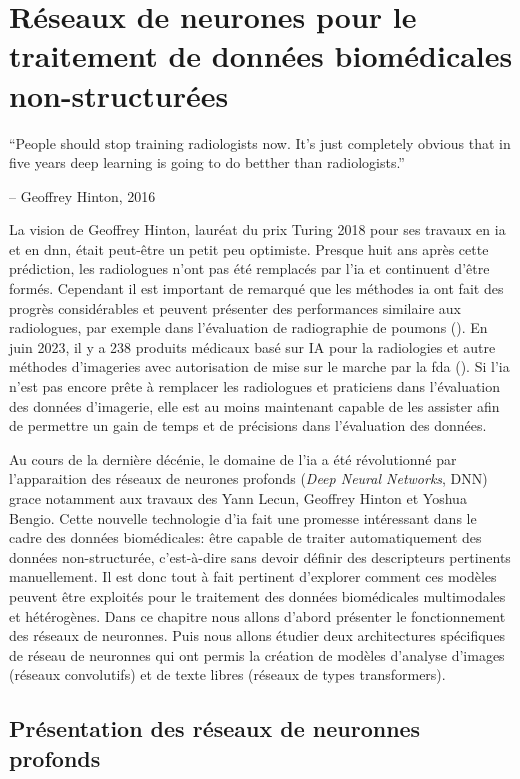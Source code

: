 \chapter{Réseaux de neurones pour le traitement de données biomédicales non-structurées}

\epigraph{\LARGE{``People should stop training radiologists now. It's just completely obvious that in five years deep learning is going to do betther than radiologists.''}}{\LARGE{-- Geoffrey Hinton, 2016}}


La vision de Geoffrey Hinton, lauréat du prix Turing 2018 pour ses travaux en \gls{ia} et en \gls{dnn}, était peut-être un petit peu optimiste. Presque huit ans après cette prédiction, les radiologues n'ont pas été remplacés par l'\gls{ia} et continuent d'être formés. Cependant il est important de remarqué que les méthodes \gls{ia} ont fait des progrès considérables et peuvent présenter des performances similaire aux radiologues, par exemple dans l'évaluation de radiographie de poumons (\cite{frauke_rudolf_ai_2023}). En juin 2023, il y a 238 produits médicaux basé sur IA pour la radiologies et autre méthodes d'imageries avec autorisation de mise sur le marche par la \gls{fda} (\cite{keith_j_dreyer_acr_2023}). Si l'\gls{ia} n'est pas encore prête à remplacer les radiologues et praticiens dans l'évaluation des données d'imagerie, elle est au moins maintenant capable de les assister afin de permettre un gain de temps et de précisions dans l'évaluation des données.


Au cours de la dernière décénie, le domaine de l'\gls{ia} a été révolutionné par l'apparaition des réseaux de neurones profonds (\textit{Deep Neural Networks}, DNN) grace notamment aux travaux des Yann Lecun, Geoffrey Hinton et Yoshua Bengio. Cette nouvelle technologie d'\gls{ia} fait une promesse intéressant dans le cadre des données biomédicales: être capable de traiter automatiquement des données non-structurée, c’est-à-dire sans devoir définir des descripteurs pertinents manuellement. Il est donc tout à fait pertinent d'explorer comment ces modèles peuvent être exploités pour le traitement des données biomédicales multimodales et hétérogènes. Dans ce chapitre nous allons d'abord présenter le fonctionnement des réseaux de neuronnes. Puis nous allons étudier deux architectures spécifiques de réseau de neuronnes qui ont permis la création de modèles d'analyse d'images (réseaux convolutifs)  et de texte libres (réseaux de types transformers).

\section{Présentation des réseaux de neuronnes profonds}


